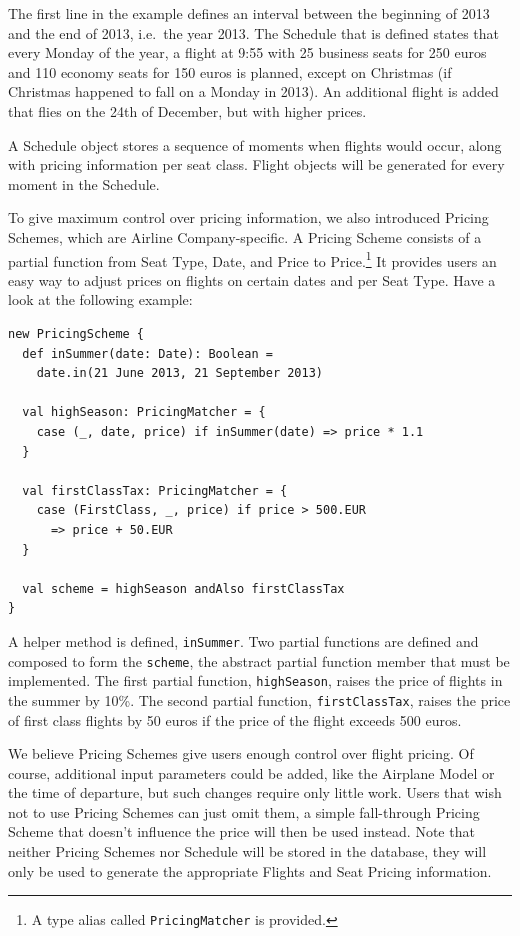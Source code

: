 \documentclass[a4paper]{article}
\renewcommand{\sc}[1]{\lstinline{#1}}
\begin{document}
The first line in the example defines an interval between the beginning of 2013 and the end of 2013, i.e.\ the year 2013.
The Schedule that is defined states that every Monday of the year, a flight at 9:55 with 25 business seats for 250 euros and 110 economy seats for 150 euros is planned, except on Christmas (if Christmas happened to fall on a Monday in 2013).
An additional flight is added that flies on the 24th of December, but with higher prices.

A Schedule object stores a sequence of moments when flights would occur, along with pricing information per seat class.
Flight objects will be generated for every moment in the Schedule.

To give maximum control over pricing information, we also introduced Pricing Schemes, which are Airline Company-specific.
A Pricing Scheme consists of a partial function from Seat Type, Date, and Price to Price.\footnote{A type alias called \sc{PricingMatcher} is provided.}
It provides users an easy way to adjust prices on flights on certain dates and per Seat Type.
Have a look at the following example:

\begin{lstlisting}
new PricingScheme {
  def inSummer(date: Date): Boolean =
    date.in(21 June 2013, 21 September 2013)

  val highSeason: PricingMatcher = {
    case (_, date, price) if inSummer(date) => price * 1.1
  }

  val firstClassTax: PricingMatcher = {
    case (FirstClass, _, price) if price > 500.EUR
      => price + 50.EUR
  }

  val scheme = highSeason andAlso firstClassTax
}
\end{lstlisting}

A helper method is defined, \sc{inSummer}.
Two partial functions are defined and composed to form the \sc{scheme}, the abstract partial function member that must be implemented.
The first partial function, \sc{highSeason}, raises the price of flights in the summer by 10\%.
The second partial function, \sc{firstClassTax}, raises the price of first class flights by 50 euros if the price of the flight exceeds 500 euros.

We believe Pricing Schemes give users enough control over flight pricing.
Of course, additional input parameters could be added, like the Airplane Model or the time of departure, but such changes require only little work.
Users that wish not to use Pricing Schemes can just omit them, a simple fall-through Pricing Scheme that doesn't influence the price will then be used instead.
Note that neither Pricing Schemes nor Schedule will be stored in the database, they will only be used to generate the appropriate Flights and Seat Pricing information.
\end{document}
